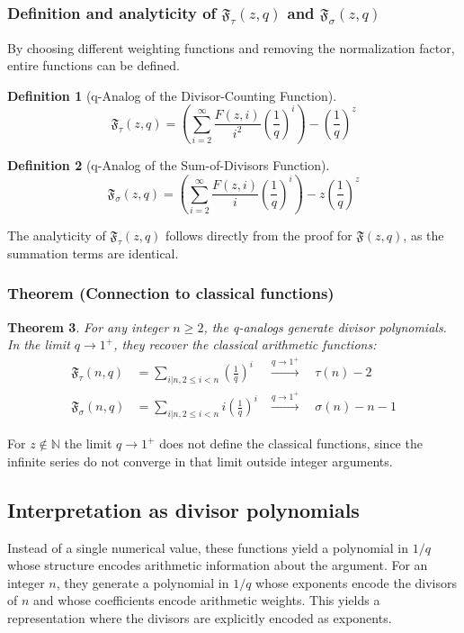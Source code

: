 \documentclass[11pt,a4paper]{amsart}
\newcommand{\N}{\mathbb{N}}
\theoremstyle{plain}
\newtheorem{theorem}{Theorem}[section]
\theoremstyle{definition}
\newtheorem{definition}[theorem]{Definition}
\theoremstyle{remark}
\begin{document}
\subsubsection{Definition and analyticity of $\mathfrak{F}_\tau(z,q)$ and $\mathfrak{F}_\sigma(z,q)$}
By choosing different weighting functions and removing the normalization factor, entire functions can be defined.
\begin{definition}[q-Analog of the Divisor-Counting Function]
\[\mathfrak{F}_\tau(z,q) = \left( \sum_{i=2}^{\infty} \frac{F(z,i)}{i^2} \left(\frac{1}{q}\right)^i \right) - \left(\frac{1}{q}\right)^z\]
\end{definition}
\begin{definition}[q-Analog of the Sum-of-Divisors Function]
\[\mathfrak{F}_\sigma(z,q) = \left( \sum_{i=2}^{\infty} \frac{F(z,i)}{i} \left(\frac{1}{q}\right)^i \right) - z \left(\frac{1}{q}\right)^z\]
\end{definition}
The analyticity of $\mathfrak{F}_\tau(z,q)$ follows directly from the proof for $\mathfrak{F}(z,q)$, as the summation terms are identical.

\subsubsection{Theorem (Connection to classical functions)}
\begin{theorem}\label{thm:q-analog-limit}
For any integer $n \ge 2$, the q-analogs generate divisor polynomials.
In the limit $q \to 1^+$, they recover the classical arithmetic functions:
\begin{align*}
    \mathfrak{F}_\tau(n,q) &= \sum_{i|n, 2 \le i < n} \left(\frac{1}{q}\right)^i & \xrightarrow{q\to1^+} \quad \tau(n)-2 \\
    \mathfrak{F}_\sigma(n,q) &= \sum_{i|n, 2 \le i < n} i \left(\frac{1}{q}\right)^i & \xrightarrow{q\to1^+} \quad \sigma(n)-n-1
\end{align*}
\end{theorem}

\noindent
For $z\notin\N$ the limit $q\to1^+$ does not define the classical functions, since the infinite series do not converge in that limit outside integer arguments.

\subsection{Interpretation as divisor polynomials}
Instead of a single numerical value, these functions yield a polynomial in $1/q$ whose structure encodes arithmetic information about the argument. For an integer $n$, they generate a polynomial in $1/q$ whose exponents encode the divisors of $n$ and whose coefficients encode arithmetic weights. This yields a representation where the divisors are explicitly encoded as exponents.
\end{document}
